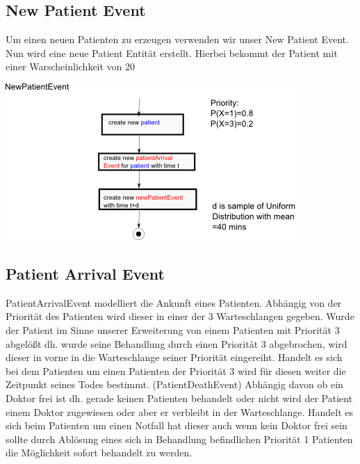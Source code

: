 \documentclass[12pt,fleqn,a4paper]{article}
\begin{document}
\subsection{New Patient Event}
Um einen neuen Patienten zu erzeugen verwenden wir unser New Patient Event. Nun wird eine neue Patient Entit\"{a}t erstellt. Hierbei bekommt der Patient mit einer Warscheinlichkeit von 20%
\begin{center}
\includegraphics[scale=1]{img/NewPatientEvent}
\end{center}




\subsection{Patient Arrival Event}

PatientArrivalEvent modelliert die Ankunft eines Patienten. 
Abh\"{a}ngig von der Priorit\"{a}t des Patienten wird dieser in einer der 3 Warteschlangen gegeben. Wurde der Patient im Sinne unserer Erweiterung von einem Patienten mit Priorit\"{a}t 3 abgel\"{o}\ss t dh. wurde seine Behandlung durch einen Priorit\"{a}t 3 abgebrochen, wird dieser in vorne in die Warteschlange seiner Priorit\"{a}t eingereiht. Handelt es sich bei dem Patienten um einen Patienten der Priorit\"{a}t 3 wird f\"{u}r diesen weiter die Zeitpunkt seines Todes bestimmt. (PatientDeathEvent)
Abh\"{a}ngig davon ob ein Doktor frei ist dh. gerade keinen Patienten behandelt oder nicht wird der Patient einem Doktor zugewiesen oder aber er verbleibt in der Warteschlange. 
Handelt es sich beim Patienten um einen Notfall hat dieser auch wenn kein Doktor frei sein sollte durch Abl\"{o}sung eines sich in Behandlung befindlichen Priorit\"{a}t 1 Patienten die M\"{o}glichkeit sofort behandelt zu werden. 
\end{document}

